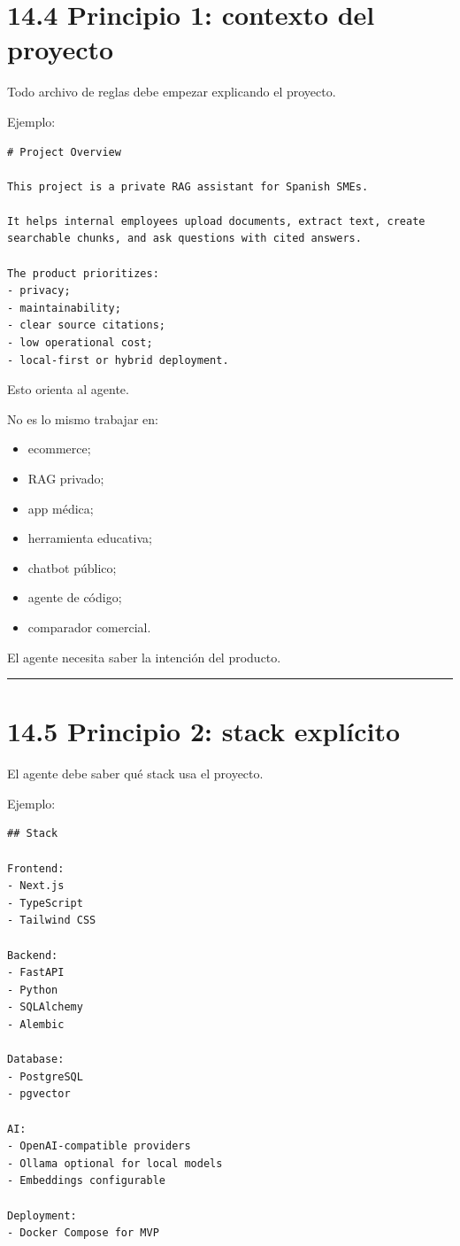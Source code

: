 \section{14.4 Principio 1: contexto del
proyecto}\label{principio-1-contexto-del-proyecto}

Todo archivo de reglas debe empezar explicando el proyecto.

Ejemplo:

\begin{lstlisting}
# Project Overview

This project is a private RAG assistant for Spanish SMEs.

It helps internal employees upload documents, extract text, create searchable chunks, and ask questions with cited answers.

The product prioritizes:
- privacy;
- maintainability;
- clear source citations;
- low operational cost;
- local-first or hybrid deployment.
\end{lstlisting}

Esto orienta al agente.

No es lo mismo trabajar en:

\begin{itemize}
\tightlist
\item
  ecommerce;
\item
  RAG privado;
\item
  app médica;
\item
  herramienta educativa;
\item
  chatbot público;
\item
  agente de código;
\item
  comparador comercial.
\end{itemize}

El agente necesita saber la intención del producto.

\begin{center}\rule{0.5\linewidth}{0.5pt}\end{center}

\section{14.5 Principio 2: stack
explícito}\label{principio-2-stack-expluxedcito}

El agente debe saber qué stack usa el proyecto.

Ejemplo:

\begin{lstlisting}
## Stack

Frontend:
- Next.js
- TypeScript
- Tailwind CSS

Backend:
- FastAPI
- Python
- SQLAlchemy
- Alembic

Database:
- PostgreSQL
- pgvector

AI:
- OpenAI-compatible providers
- Ollama optional for local models
- Embeddings configurable

Deployment:
- Docker Compose for MVP
\end{lstlisting}

